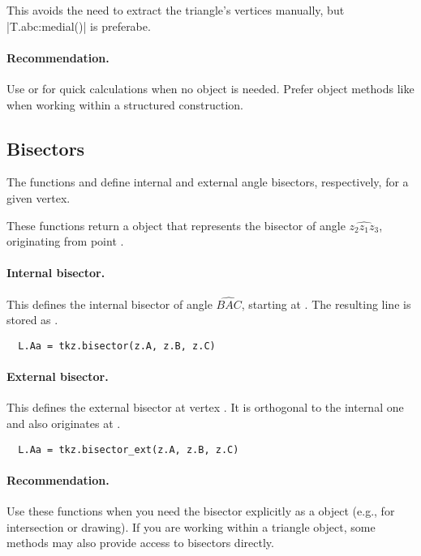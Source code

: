 This avoids the need to extract the triangle’s vertices manually, but |T.abc:medial()| is preferabe.

\paragraph{Recommendation.}
Use  or  for quick calculations when no object is needed. Prefer object methods like  when working within a structured construction.

\subsection{Bisectors}
\label{sub:bisector}

The functions  and  define internal and external angle bisectors, respectively, for a given vertex.

These functions return a  object that represents the bisector of angle $\widehat{z_2 z_1 z_3}$, originating from point .

\paragraph{Internal bisector.}
 This defines the internal bisector of angle $ \widehat{BAC}$, starting at . The resulting line is stored as .

\begin{mybox}
\begin{verbatim}
  L.Aa = tkz.bisector(z.A, z.B, z.C)
\end{verbatim}
\end{mybox}

\paragraph{External bisector.}
This defines the external bisector at vertex . It is orthogonal to the internal one and also originates at .

\begin{mybox}
\begin{verbatim}
  L.Aa = tkz.bisector_ext(z.A, z.B, z.C)
\end{verbatim}
\end{mybox}


\paragraph{Recommendation.}
Use these functions when you need the bisector explicitly as a  object (e.g., for intersection or drawing). If you are working within a triangle object, some methods may also provide access to bisectors directly.

